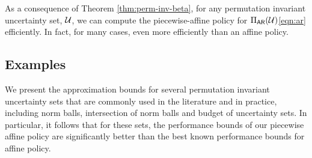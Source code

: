 \documentclass[11pt]{article}
\theoremstyle{plain}
\theoremstyle{definition}
\numberwithin{equation}{section}%
\numberwithin{equation}{section}%
\begin{document}
As a consequence of Theorem \ref{thm:perm-inv-beta}, for any permutation invariant uncertainty set, ${\cal U}$, we can compute the piecewise-affine policy for $\Pi_{\sf AR}({\cal U})$\eqref{eqn:ar} efficiently. In fact, for many cases, even more efficiently than an affine policy.


\subsection{Examples}

We present the approximation bounds for several permutation invariant uncertainty sets that are commonly used in the literature and in practice, including norm balls, intersection of norm balls and budget of uncertainty sets. In particular, it follows that for these sets, the performance bounds of our piecewise affine policy are significantly better than the best known performance bounds for affine policy.

\end{document}
